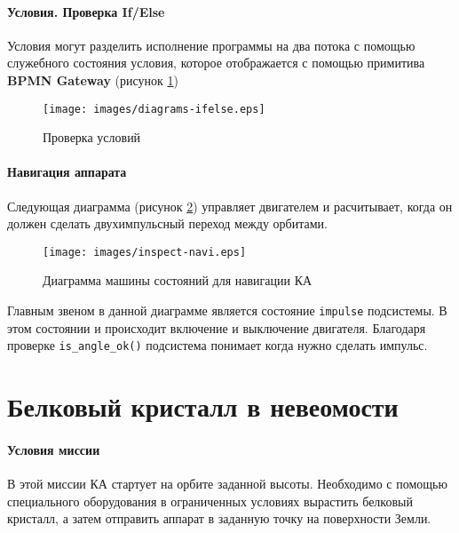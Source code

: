 \documentclass[12pt,a4paper]{article}
\begin{document}
\clearpage

\paragraph{Условия. Проверка If/Else}Условия могут разделить исполнение программы на два потока с помощью служебного состояния условия, которое отображается с помощью примитива \textbf{BPMN Gateway} (рисунок \ref{Pic:IfElse})

\begin{figure}[tbh]
  \begin{center}
    \texttt{[image: images/diagrams-ifelse.eps]}
    \caption{Проверка условий}
    \label{Pic:IfElse}
  \end{center}
\end{figure}

\paragraph{Навигация аппарата} Следующая диаграмма (рисунок \ref{Pic:INSPECT-navi}) управляет двигателем и расчитывает, когда он должен сделать двухимпульсный переход между орбитами.

\begin{figure}[tbh]
  \begin{center}
    \texttt{[image: images/inspect-navi.eps]}
    \caption{Диаграмма машины состояний для навигации КА}
    \label{Pic:INSPECT-navi}
  \end{center}
\end{figure}

Главным звеном в данной диаграмме является состояние \verb'impulse' подсистемы. В этом состоянии и происходит включение и выключение двигателя. Благодаря проверке \verb'is_angle_ok()' подсистема понимает когда нужно сделать импульс.

\section{Белковый кристалл в невеомости}

\paragraph{Условия миссии} В этой миссии КА стартует на орбите
заданной высоты. Необходимо с помощью специального оборудования в ограниченных условиях вырастить белковый кристалл, а затем отправить аппарат в заданную точку на поверхности Земли.
\end{document}
